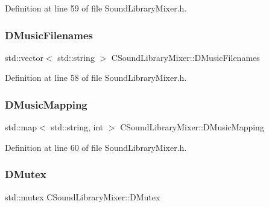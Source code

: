 Definition at line 59 of file Sound\+Library\+Mixer.\+h.

\hypertarget{classCSoundLibraryMixer_a105a9c5d911492518ac706039bf1de16}{}\label{classCSoundLibraryMixer_a105a9c5d911492518ac706039bf1de16} 
\subsubsection{\texorpdfstring{D\+Music\+Filenames}{DMusicFilenames}}
{\footnotesize\ttfamily std\+::vector$<$ std\+::string $>$ C\+Sound\+Library\+Mixer\+::\+D\+Music\+Filenames\hspace{0.3cm}{\ttfamily [protected]}}



Definition at line 58 of file Sound\+Library\+Mixer.\+h.

\hypertarget{classCSoundLibraryMixer_ada2510450315651ebe948ce63960b98a}{}\label{classCSoundLibraryMixer_ada2510450315651ebe948ce63960b98a} 
\subsubsection{\texorpdfstring{D\+Music\+Mapping}{DMusicMapping}}
{\footnotesize\ttfamily std\+::map$<$ std\+::string, int $>$ C\+Sound\+Library\+Mixer\+::\+D\+Music\+Mapping\hspace{0.3cm}{\ttfamily [protected]}}



Definition at line 60 of file Sound\+Library\+Mixer.\+h.

\hypertarget{classCSoundLibraryMixer_a955562a0638df831413a1c6b8860f9fb}{}\label{classCSoundLibraryMixer_a955562a0638df831413a1c6b8860f9fb} 
\subsubsection{\texorpdfstring{D\+Mutex}{DMutex}}
{\footnotesize\ttfamily std\+::mutex C\+Sound\+Library\+Mixer\+::\+D\+Mutex\hspace{0.3cm}{\ttfamily [protected]}}



